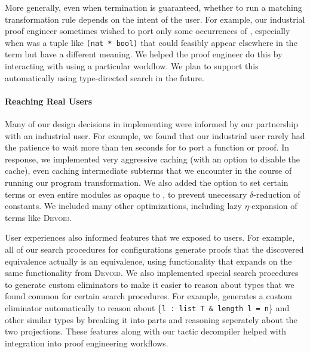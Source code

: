 More generally, even when termination is guaranteed, whether to run a matching transformation rule
depends on the intent of the user.
For example, our industrial proof engineer sometimes wished to port only some occurrences of \A,
especially when \A was a tuple like \lstinline{(nat * bool)} that could feasibly appear elsewhere in the term
but have a different meaning.
We helped the proof engineer do this by interacting with \toolname using a particular workflow.
We plan to support this automatically using type-directed search in the future.

\paragraph{Reaching Real Users}
Many of our design decisions in implementing \toolname were informed by our partnership with
an industrial user.
For example, we found that our industrial user rarely had the patience to wait more than ten seconds
for \toolname to port a function or proof.
In response, we implemented very aggressive caching (with an option to disable the cache), even caching intermediate subterms that
we encounter in the course of running our program transformation.
We also added the option to set certain terms or even entire modules as opaque to \toolname, to prevent
unecessary $\delta$-reduction of constants.
We included many other optimizations, including lazy $\eta$-expansion of terms like \textsc{Devoid}.

User experiences also informed features that we exposed to users.
For example, all of our search procedures for configurations generate proofs that the discovered
equivalence actually is an equivalence, using functionality that expands on the same functionality from \textsc{Devoid}.
We also implemented special search procedures to generate custom eliminators to make it easier to reason about
types that we found common for certain search procedures.
For example, \toolname generates a custom eliminator automatically to reason about \{\lstinline{l : list T & length l = n}\}
and other similar types by breaking it into parts and reasoning seperately about the two projections.
These features along with our tactic decompiler helped with integration into proof engineering workflows.


